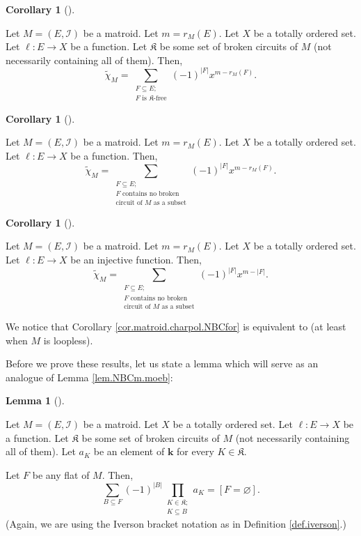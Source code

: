 \documentclass[numbers=enddot,12pt,final,onecolumn,notitlepage]{scrartcl}%
\theoremstyle{definition}
\newtheorem{lem}[theo]{Lemma}
\newenvironment{lemma}[1][]
{\begin{lem}[#1]\begin{leftbar}}
{\end{leftbar}\end{lem}}
\newtheorem{coro}[theo]{Corollary}
\newenvironment{corollary}[1][]
{\begin{coro}[#1]\begin{leftbar}}
{\end{leftbar}\end{coro}}
\let\sumnonlimits\sum
\let\prodnonlimits\prod
\renewcommand{\sum}{\sumnonlimits\limits}
\renewcommand{\prod}{\prodnonlimits\limits}
\begin{document}
\begin{corollary}
\label{cor.matroid.charpol.K-free}Let $M=\left(  E,\mathcal{I}\right)  $ be a
matroid. Let $m=r_{M}\left(  E\right)  $. Let $X$ be a totally ordered set.
Let $\ell:E\rightarrow X$ be a function. Let $\mathfrak{K}$ be some set of
broken circuits of $M$ (not necessarily containing all of them). Then,%
\[
\widetilde{\chi}_{M}=\sum_{\substack{F\subseteq E;\\F\text{ is }%
\mathfrak{K}\text{-free}}}\left(  -1\right)  ^{\left\vert F\right\vert
}x^{m-r_{M}\left(  F\right)  }.
\]

\end{corollary}

\begin{corollary}
\label{cor.matroid.charpol.NBC}Let $M=\left(  E,\mathcal{I}\right)  $ be a
matroid. Let $m=r_{M}\left(  E\right)  $. Let $X$ be a totally ordered set.
Let $\ell:E\rightarrow X$ be a function. Then,%
\[
\widetilde{\chi}_{M}=\sum_{\substack{F\subseteq E;\\F\text{ contains no
broken}\\\text{circuit of }M\text{ as a subset}}}\left(  -1\right)
^{\left\vert F\right\vert }x^{m-r_{M}\left(  F\right)  }.
\]

\end{corollary}

\begin{corollary}
\label{cor.matroid.charpol.NBCfor}Let $M=\left(  E,\mathcal{I}\right)  $ be a
matroid. Let $m=r_{M}\left(  E\right)  $. Let $X$ be a totally ordered set.
Let $\ell:E\rightarrow X$ be an injective function. Then,%
\[
\widetilde{\chi}_{M}=\sum_{\substack{F\subseteq E;\\F\text{ contains no
broken}\\\text{circuit of }M\text{ as a subset}}}\left(  -1\right)
^{\left\vert F\right\vert }x^{m-\left\vert F\right\vert }.
\]

\end{corollary}

We notice that Corollary \ref{cor.matroid.charpol.NBCfor} is equivalent to
\cite[Theorem 4.12]{Stanley} (at least when $M$ is loopless).

Before we prove these results, let us state a lemma which will serve as an
analogue of Lemma \ref{lem.NBCm.moeb}:

\begin{lemma}
\label{lem.matroid.NBCm.moeb}Let $M=\left(  E,\mathcal{I}\right)  $ be a
matroid. Let $X$ be a totally ordered set. Let $\ell:E\rightarrow X$ be a
function. Let $\mathfrak{K}$ be some set of broken circuits of $M$ (not
necessarily containing all of them). Let $a_{K}$ be an element of $\mathbf{k}$
for every $K\in\mathfrak{K}$.

Let $F$ be any flat of $M$. Then,%
\begin{equation}
\sum_{B\subseteq F}\left(  -1\right)  ^{\left\vert B\right\vert }%
\prod_{\substack{K\in\mathfrak{K};\\K\subseteq B}}a_{K}=\left[  F=\varnothing
\right]  . \label{eq.lem.matroid.NBCm.moeb.1}%
\end{equation}
(Again, we are using the Iverson bracket notation as in Definition
\ref{def.iverson}.)
\end{lemma}
\end{document}
